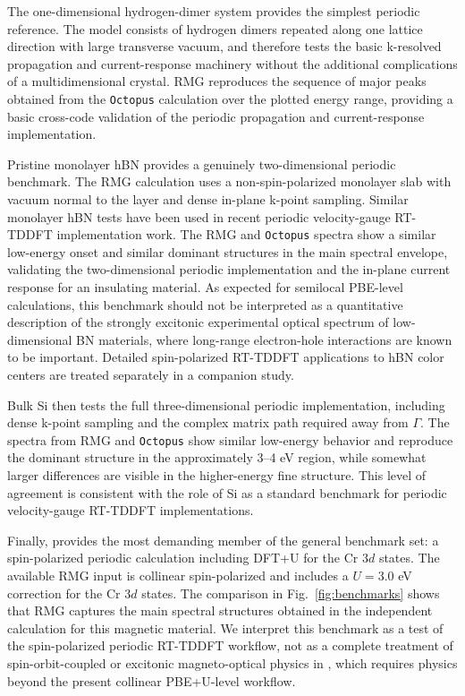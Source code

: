 The one-dimensional hydrogen-dimer system provides the simplest
periodic reference.  The model consists of hydrogen dimers repeated
along one lattice direction with large transverse vacuum, and therefore
tests the basic k-resolved propagation and current-response machinery
without the additional complications of a multidimensional crystal.
RMG reproduces the sequence of major peaks obtained from the
\texttt{Octopus} calculation over the plotted energy range, providing
a basic cross-code validation of the periodic propagation and
current-response implementation.

Pristine monolayer hBN provides a genuinely two-dimensional periodic
benchmark.  The RMG calculation uses a non-spin-polarized monolayer
slab with vacuum normal to the layer and dense in-plane k-point
sampling.  Similar monolayer hBN tests have been used in recent
periodic velocity-gauge RT-TDDFT implementation
work.\cite{Hanasaki-2023}  The RMG and \texttt{Octopus} spectra show
a similar low-energy onset and similar dominant structures in the main
spectral envelope, validating the two-dimensional periodic
implementation and the in-plane current response for an insulating
material.  As expected for semilocal PBE-level calculations, this
benchmark should not be interpreted as a quantitative description of
the strongly excitonic experimental optical spectrum of
low-dimensional BN materials, where long-range electron-hole
interactions are known to be important.\cite{Wirtz-BN-excitons-2006}
Detailed spin-polarized RT-TDDFT applications to hBN color centers are
treated separately in a companion study.

Bulk Si then tests the full three-dimensional periodic implementation,
including dense k-point sampling and the complex matrix path required
away from $\Gamma$.  The spectra from RMG and \texttt{Octopus} show
similar low-energy behavior and reproduce the dominant structure in
the approximately 3--4 eV region, while somewhat larger differences
are visible in the higher-energy fine structure.  This level of
agreement is consistent with the role of Si as a standard benchmark
for periodic velocity-gauge RT-TDDFT
implementations.\cite{Hekele-2021}

Finally,  provides the most demanding member of the general
benchmark set: a spin-polarized periodic calculation including DFT+U
for the Cr $3d$ states.  The available RMG input is collinear
spin-polarized and includes a $U=3.0$ eV correction for the Cr $3d$
states.  The comparison in Fig.~\ref{fig:benchmarks} shows that RMG
captures the main spectral structures obtained in the independent
calculation for this magnetic material.  We interpret this benchmark
as a test of the spin-polarized periodic RT-TDDFT workflow, not as a
complete treatment of spin-orbit-coupled or excitonic
magneto-optical physics in , which requires physics beyond
the present collinear PBE+U-level
workflow.\cite{Wu-CrI3-excitons-2019}

